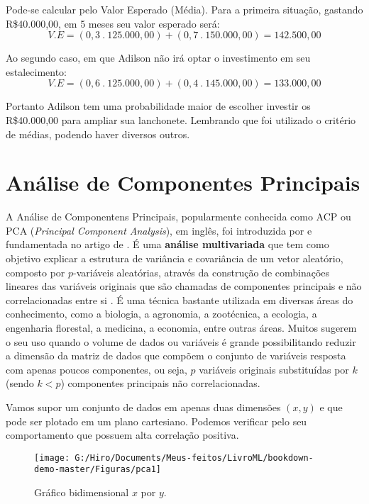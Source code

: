 \documentclass[
  openany]{book}
\begin{document}
Pode-se calcular pelo Valor Esperado (Média). Para a primeira situação, gastando R\$40.000,00, em 5 meses seu valor esperado será:
\[V.E=(0,3\ .\ 125.000,00)+(0,7\ . \ 150.000,00)= 142.500,00\]

Ao segundo caso, em que Adilson não irá optar o investimento em seu estalecimento:
\[V.E=(0,6\ .\ 125.000,00)+(0,4\ . \ 145.000,00)= 133.000,00\]

Portanto Adilson tem uma probabilidade maior de escolher investir os R\$40.000,00 para ampliar sua lanchonete. Lembrando que foi utilizado o critério de médias, podendo haver diversos outros.

\hypertarget{AC}{%
\section{Análise de Componentes Principais}\label{AC}}

A Análise de Componentens Principais, popularmente conhecida como ACP ou PCA (\emph{Principal Component Analysis}), em inglês, foi introduzida por \citet{pearson1901liii} e fundamentada no artigo de \citet{hotelling1933analysis}. É uma \textbf{análise multivariada} que tem como objetivo explicar a estrutura de variância e covariância de um vetor aleatório, composto por \(p\)-variáveis aleatórias, através da construção de combinações lineares das variáveis originais que são chamadas de componentes principais e não correlacionadas entre si \citep{mingoti2007analise}. É uma técnica bastante utilizada em diversas áreas do conhecimento, como a biologia, a agronomia, a zootécnica, a ecologia, a engenharia florestal, a medicina, a economia, entre outras áreas. Muitos sugerem o seu uso quando o volume de dados ou variáveis é grande possibilitando reduzir a dimensão da matriz de dados que compõem o conjunto de variáveis resposta com apenas poucos componentes, ou seja, \(p\) variáveis originais substituídas por \(k\) (sendo \(k < p\)) componentes principais não correlacionadas.

Vamos supor um conjunto de dados em apenas duas dimensões \((x, y)\) e que pode ser plotado em um plano cartesiano. Podemos verificar pelo seu comportamento que possuem alta correlação positiva.

\begin{figure}

{\centering \texttt{[image: G:/Hiro/Documents/Meus-feitos/LivroML/bookdown-demo-master/Figuras/pca1]} 

}

\caption{Gráfico bidimensional \(x\) por \(y\).}\label{fig:pca1}
\end{figure}
\end{document}
